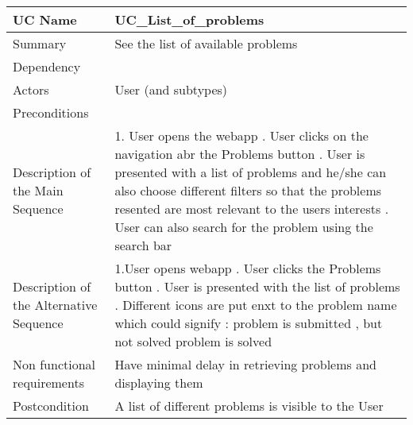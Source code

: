 \begin{table}[htbp]
\centering
\begin{tabularx}{\textwidth}{|l|X|}
\hline
UC Name & UC\_List\_of\_problems \\ \hline

Summary &  See the list of available problems \\ \hline

Dependency & \- \\ \hline

Actors & User (and subtypes) \\ \hline

Preconditions & \- \\ \hline

Description of the Main Sequence & 1. User opens the webapp \newline  2. User clicks on the navigation abr the Problems button \newline 3. User is presented with a list of problems and he/she can also choose different filters so that the problems resented are most relevant to the users interests \newline 4. User can also search for the problem using the search bar \\ \hline

Description of the Alternative Sequence & 1.User opens webapp \newline 2. User clicks the Problems  button \newline 3. User is presented with the list of problems \newline 4. Different icons are put enxt to the problem name which could signify : \newline \- problem is submitted , but not solved \newline \- problem is solved \\ \hline

Non functional requirements & Have minimal delay in retrieving problems and displaying them \\ \hline

Postcondition & A list of different problems is visible to the User \\ \hline

\end{tabularx}
\end{table}

